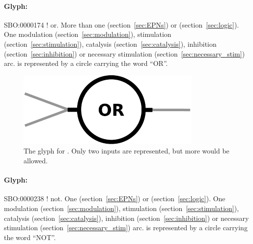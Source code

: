 \paragraph{Glyph: }\label{sec:or}

\begin{glyphDescription}
 \glyphSboTerm SBO:0000174 ! or.
 \glyphOrigin More than one  (section~\ref{sec:EPNs}) or  (section~\ref{sec:logic}).
 \glyphTarget  One modulation (section~\ref{sec:modulation}), stimulation (section~\ref{sec:stimulation}), catalysis (section~\ref{sec:catalysis}), inhibition (section~\ref{sec:inhibition}) or necessary stimulation (section~\ref{sec:necessary_stim}) arc.
 \glyphNode {} is represented by a circle carrying the word ``OR''.
 \end{glyphDescription}

\begin{figure}[H]
  \centering
  \includegraphics[scale = 0.5]{images/or}
  \caption{The \PD glyph for . Only two inputs are represented, but more would be allowed.}
  \label{fig:or}
\end{figure}


\paragraph{Glyph: }\label{sec:not}

\begin{glyphDescription}
 \glyphSboTerm SBO:0000238 ! not.
 \glyphOrigin One  (section~\ref{sec:EPNs}) or  (section~\ref{sec:logic}).
 \glyphTarget  One modulation (section~\ref{sec:modulation}), stimulation (section~\ref{sec:stimulation}), catalysis (section~\ref{sec:catalysis}), inhibition (section~\ref{sec:inhibition}) or necessary stimulation (section~\ref{sec:necessary_stim}) arc.
 \glyphNode {} is represented by a circle carrying the word ``NOT''.
 \end{glyphDescription}


